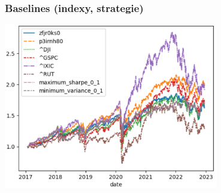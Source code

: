 \begin{frame}
    \frametitle{Baselines (indexy, strategie)}
    \begin{center}
        \centering
        \includegraphics[width=0.7\textwidth]{img/returns}
    \end{center}
\end{frame}







